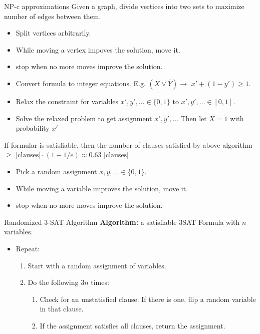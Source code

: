 \documentclass[10pt,a4paper]{article}
\begin{document}
\begin{multicols}{3}
\begin{textbox}{NP-c approximations}
         Given a graph, divide vertices into two sets to maximize
        number of edges between them.
        \begin{itemize}
            \item Split vertices arbitrarily.
            \item While moving a vertex impoves the solution, move it.
            \item stop when no more moves improve the solution.
        \end{itemize}
        \begin{itemize}
            \item Convert formula to integer equations. E.g. $(X \vee
                      \bar{Y}) \to$ $x' + (1 - y') \geq 1$.
            \item Relax the constraint for variables $x', y', \dots \in \{0, 1\}$ to
                  $x', y', \dots \in [0, 1]$.
            \item Solve the relaxed problem to get assignment $x', y', \dots$
                  Then let $X = 1$ with probability $x'$
        \end{itemize}
         If formular is satisfiable, then the number of clauses satisfied
        by above algorithm $\geq \text{ |clauses|} \cdot (1 - 1/e) \approx 0.63\text{ |clauses|}$

        \begin{itemize}
            \item Pick a random assignment $x, y, \dots \in \{0, 1\}$.
            \item While moving a variable improves the solution, move it.
            \item stop when no more moves improve the solution.
        \end{itemize}
    \end{textbox}


    \begin{textbox}{Randomized 3-SAT Algorithm}
        {\bf Algorithm:}  a satisfiable 3SAT Formula with $n$ variables.
        \begin{itemize}
            \item Repeat:
                  \begin{enumerate}
                      \item Start with a random assignment of variables.
                      \item Do the following $3n$ times:
                            \begin{enumerate}
                                \item Check for an unstatisfied clause. If there is one, flip a random variable in that clause.
                                \item If the assignment satisfies all clauses, return the assignment.
                            \end{enumerate}
                  \end{enumerate}
        \end{itemize}


\end{textbox}
\end{multicols}
\end{document}
